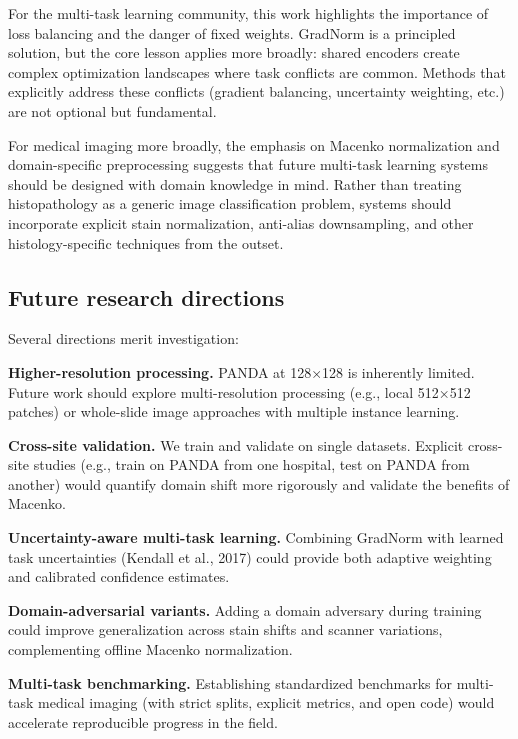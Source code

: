 \documentclass[conference,a4paper]{IEEEtran}
\begin{document}
For the multi-task learning community, this work highlights the importance of loss balancing and the danger of fixed weights. GradNorm is a principled solution, but the core lesson applies more broadly: shared encoders create complex optimization landscapes where task conflicts are common. Methods that explicitly address these conflicts (gradient balancing, uncertainty weighting, etc.) are not optional but fundamental.

For medical imaging more broadly, the emphasis on Macenko normalization and domain-specific preprocessing suggests that future multi-task learning systems should be designed with domain knowledge in mind. Rather than treating histopathology as a generic image classification problem, systems should incorporate explicit stain normalization, anti-alias downsampling, and other histology-specific techniques from the outset.

\subsection{Future research directions}
Several directions merit investigation:

\textbf{Higher-resolution processing.} PANDA at 128×128 is inherently limited. Future work should explore multi-resolution processing (e.g., local 512×512 patches) or whole-slide image approaches with multiple instance learning.

\textbf{Cross-site validation.} We train and validate on single datasets. Explicit cross-site studies (e.g., train on PANDA from one hospital, test on PANDA from another) would quantify domain shift more rigorously and validate the benefits of Macenko.

\textbf{Uncertainty-aware multi-task learning.} Combining GradNorm with learned task uncertainties (Kendall et al., 2017) could provide both adaptive weighting and calibrated confidence estimates.

\textbf{Domain-adversarial variants.} Adding a domain adversary during training could improve generalization across stain shifts and scanner variations, complementing offline Macenko normalization.

\textbf{Multi-task benchmarking.} Establishing standardized benchmarks for multi-task medical imaging (with strict splits, explicit metrics, and open code) would accelerate reproducible progress in the field.
\end{document}
